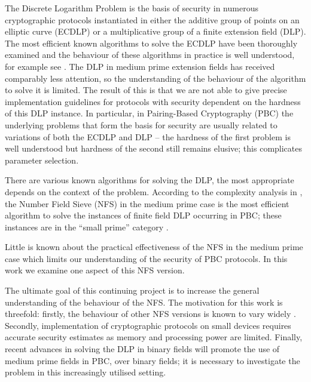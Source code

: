 \documentclass[a4paper, 12pt, envcountsect, runningheads]{llncs}
\numberwithin{figure}{section}
\numberwithin{equation}{section}
\begin{document}
The Discrete Logarithm Problem is the basis of security in numerous cryptographic protocols instantiated in either the additive group of points on an elliptic curve (ECDLP) or a multiplicative group of a finite extension field (DLP). 
The most efficient known algorithms to solve the ECDLP have been thoroughly examined and the behaviour of these algorithms in practice is well understood, for example see \cite{pollard,teske,rho_chal_1,rho_chal_2,rho_efficiency}. The DLP in medium prime extension fields has received comparably less attention, so the understanding of the behaviour of the algorithm to solve it is limited. The result of this is that we are not able to give precise implementation guidelines for protocols with security dependent on the hardness of this DLP instance. In particular, in Pairing-Based Cryptography (PBC) the underlying problems that form the basis for security are usually related to variations of both the ECDLP and DLP -- the hardness of the first problem is well understood but hardness of the second still remains elusive; this complicates parameter selection.


There are various known algorithms for solving the DLP, the most appropriate depends on the context of the problem. According to the complexity analysis in \cite{joux-lercier-smart-vercauteren06}, the Number Field Sieve (NFS) in the medium prime case is the most efficient algorithm to solve the instances of finite field DLP occurring in PBC; these instances are in the ``small prime'' category \cite[Section 3.1]{joux-lercier-smart-vercauteren06}. 

Little is known about the practical effectiveness of the NFS in the medium prime case which limits our understanding of the security of PBC protocols. In this work we examine one aspect of this NFS version.

The ultimate goal of this continuing project is to increase the general understanding of the behaviour of the NFS. The motivation for this work is threefold: firstly, the behaviour of other NFS versions is known to vary widely \cite{zajac,dan_predicting_nfs}. Secondly, implementation of cryptographic protocols on small devices requires accurate security estimates as memory and processing power are limited. Finally, recent advances in solving the DLP in binary fields \cite{FFS_rob1,FFS_rob2,FFS_joux} will promote the use of medium prime fields in PBC, over binary fields; it is necessary to investigate the problem in this increasingly utilised setting.
\end{document}
